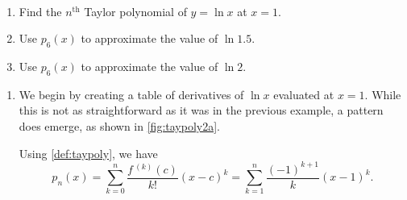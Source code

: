 \begin{example}\label{ex_taypoly2}
\mbox{}\\[-2\baselineskip]\parbox[t]{\linewidth}{\begin{enumerate}
	\item	Find the $n^\text{th}$ Taylor polynomial of $y=\ln x$ at $x=1$.
	\item	Use $p_6(x)$ to approximate the value of $\ln 1.5$.
	\item	Use $p_6(x)$ to approximate the value of $\ln 2$. 
\end{enumerate}}\vspace{0pt}
\solution
\begin{enumerate}
\item	We begin by creating a table of derivatives of $\ln x$ evaluated at $x=1$. While this is not as straightforward as it was in the previous example, a pattern does emerge, as shown in \autoref{fig:taypoly2a}.

Using \autoref{def:taypoly}, we have
\[
	p_n(x)
	= \sum_{k=0}^n\frac{f\,^{(k)}(c)}{k!}(x-c)^k
	= \sum_{k=1}^n\frac{(-1)^{k+1}}k(x-1)^k.
\]


\end{enumerate}
\end{example}
